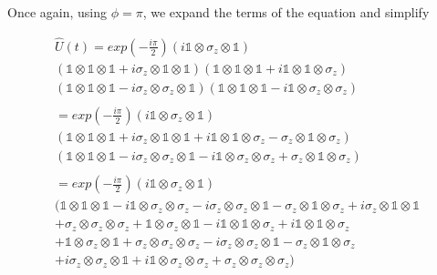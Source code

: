 Once again, using $\phi = \pi$, we expand the terms of the equation and simplify

\begin{multline*}
\hat{U} (t) = exp(-\frac{i \pi}{2})
(i \mathbb{1} \otimes \sigma_{z} \otimes \mathbb{1}) \\
(\mathbb{1} \otimes \mathbb{1} \otimes \mathbb{1} + i \sigma_{z} \otimes \mathbb{1} \otimes \mathbb{1})
(\mathbb{1} \otimes \mathbb{1} \otimes \mathbb{1} + i \mathbb{1} \otimes \mathbb{1} \otimes \sigma_{z}) \\
(\mathbb{1} \otimes \mathbb{1} \otimes \mathbb{1} - i \sigma_{z} \otimes \sigma_{z} \otimes \mathbb{1})
(\mathbb{1} \otimes \mathbb{1} \otimes \mathbb{1} - i \mathbb{1} \otimes \sigma_{z} \otimes \sigma_{z}) \\ \\
= exp(-\frac{i \pi}{2}) (i \mathbb{1} \otimes \sigma_{z} \otimes \mathbb{1}) \\
(\mathbb{1} \otimes \mathbb{1} \otimes \mathbb{1}
+ i \sigma_{z} \otimes \mathbb{1} \otimes \mathbb{1}
+ i \mathbb{1} \otimes \mathbb{1} \otimes \sigma_{z}
- \sigma_{z} \otimes \mathbb{1} \otimes \sigma_{z}) \\
(\mathbb{1} \otimes \mathbb{1} \otimes \mathbb{1}
- i \sigma_{z} \otimes \sigma_{z} \otimes \mathbb{1}
- i \mathbb{1} \otimes \sigma_{z} \otimes \sigma_{z}
+ \sigma_{z} \otimes \mathbb{1} \otimes \sigma_{z}) \\ \\
= exp(-\frac{i \pi}{2}) (i \mathbb{1} \otimes \sigma_{z} \otimes \mathbb{1}) \\ 
(\mathbb{1} \otimes \mathbb{1} \otimes \mathbb{1}
- i \mathbb{1} \otimes \sigma_{z} \otimes \sigma_{z}
- i \sigma_{z} \otimes \sigma_{z} \otimes \mathbb{1}
- \sigma_{z} \otimes \mathbb{1} \otimes \sigma_{z}
+ i \sigma_{z} \otimes \mathbb{1} \otimes \mathbb{1} \\
+ \sigma_{z} \otimes \sigma_{z} \otimes \sigma_{z}
+ \mathbb{1} \otimes \sigma_{z} \otimes \mathbb{1}
- i \mathbb{1} \otimes \mathbb{1} \otimes \sigma_{z}
+ i \mathbb{1} \otimes \mathbb{1} \otimes \sigma_{z} \\
+ \mathbb{1} \otimes \sigma_{z} \otimes \mathbb{1}
+ \sigma_{z} \otimes \sigma_{z} \otimes \sigma_{z}
- i \sigma_{z} \otimes \sigma_{z} \otimes \mathbb{1} 
- \sigma_{z} \otimes \mathbb{1} \otimes \sigma_{z} \\
+ i \sigma_{z} \otimes \sigma_{z} \otimes \mathbb{1}
+ i \mathbb{1} \otimes \sigma_{z} \otimes \sigma_{z}
+ \sigma_{z} \otimes \sigma_{z} \otimes \sigma_{z}) \\
\end{multline*}

